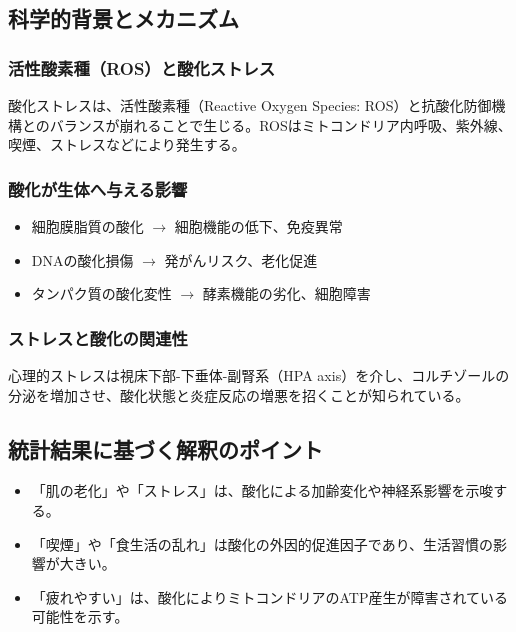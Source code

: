 \documentclass[a4paper,12pt]{article}
\begin{document}
\subsection*{科学的背景とメカニズム}

\subsubsection*{活性酸素種（ROS）と酸化ストレス}

酸化ストレスは、活性酸素種（Reactive Oxygen Species: ROS）と抗酸化防御機構とのバランスが崩れることで生じる。ROSはミトコンドリア内呼吸、紫外線、喫煙、ストレスなどにより発生する。

\subsubsection*{酸化が生体へ与える影響}

\begin{itemize}
  \item 細胞膜脂質の酸化 $\rightarrow$ 細胞機能の低下、免疫異常
  \item DNAの酸化損傷 $\rightarrow$ 発がんリスク、老化促進
  \item タンパク質の酸化変性 $\rightarrow$ 酵素機能の劣化、細胞障害
\end{itemize}

\subsubsection*{ストレスと酸化の関連性}

心理的ストレスは視床下部-下垂体-副腎系（HPA axis）を介し、コルチゾールの分泌を増加させ、酸化状態と炎症反応の増悪を招くことが知られている。

\subsection*{統計結果に基づく解釈のポイント}

\begin{itemize}
  \item 「肌の老化」や「ストレス」は、酸化による加齢変化や神経系影響を示唆する。
  \item 「喫煙」や「食生活の乱れ」は酸化の外因的促進因子であり、生活習慣の影響が大きい。
  \item 「疲れやすい」は、酸化によりミトコンドリアのATP産生が障害されている可能性を示す。
\end{itemize}
\end{document}
